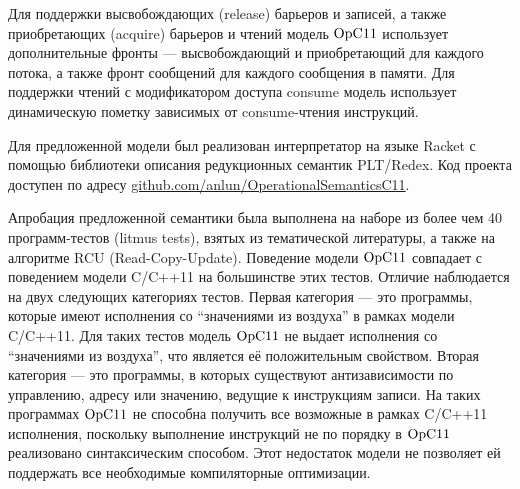 Для поддержки высвобождающих (release) барьеров и записей, а также приобретающих (acquire) барьеров и чтений
модель $\mathrm{OpC11}$ использует дополнительные фронты --- высвобождающий и приобретающий для каждого потока,
а также фронт сообщений для каждого сообщения в памяти. Для поддержки чтений с модификатором доступа
consume модель использует динамическую пометку зависимых от consume-чтения инструкций.


Для предложенной модели был реализован интерпретатор на языке Racket с помощью библиотеки описания редукционных
семантик PLT/Redex. Код проекта доступен по адресу \url{github.com/anlun/OperationalSemanticsC11}.

Апробация предложенной семантики была выполнена на наборе из более чем 40 программ-тестов (litmus tests), взятых из  тематической литературы, а также 
на алгоритме RCU (Read-Copy-Update). Поведение модели $\mathrm{OpC11}$ совпадает с поведением модели C/C++11 на большинстве этих тестов.
Отличие наблюдается на двух следующих категориях тестов. Первая категория --- это программы, которые имеют исполнения со
``значениями из воздуха'' в рамках модели C/C++11. Для таких тестов модель $\mathrm{OpC11}$ не выдает исполнения со ``значениями из воздуха'',
что является её положительным свойством. Вторая категория --- это программы, в которых существуют антизависимости по управлению,
адресу или значению, ведущие к инструкциям записи. На таких программах $\mathrm{OpC11}$ не способна получить все возможные в рамках C/C++11
исполнения, поскольку выполнение инструкций не по порядку в $\mathrm{OpC11}$ реализовано синтаксическим способом. Этот недостаток модели не позволяет ей поддержать все необходимые компиляторные оптимизации.

